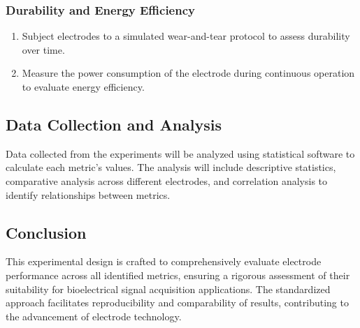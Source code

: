 \subsubsection{Durability and Energy Efficiency}
\begin{enumerate}
    \item Subject electrodes to a simulated wear-and-tear protocol to assess durability over time.
    \item Measure the power consumption of the electrode during continuous operation to evaluate energy efficiency.
\end{enumerate}

\subsection{Data Collection and Analysis}
Data collected from the experiments will be analyzed using statistical software to calculate each metric's values. The analysis will include descriptive statistics, comparative analysis across different electrodes, and correlation analysis to identify relationships between metrics.

\subsection{Conclusion}
This experimental design is crafted to comprehensively evaluate electrode performance across all identified metrics, ensuring a rigorous assessment of their suitability for bioelectrical signal acquisition applications. The standardized approach facilitates reproducibility and comparability of results, contributing to the advancement of electrode technology.








